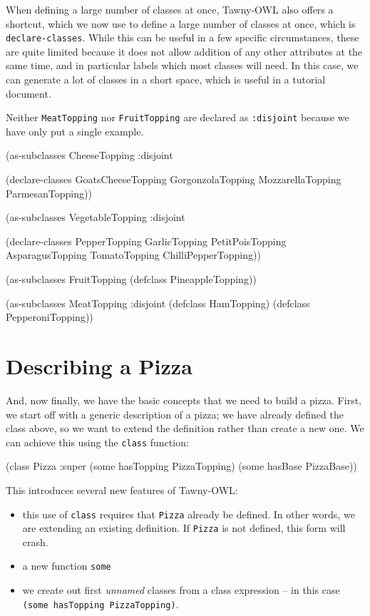 When defining a large number of classes at once, Tawny-OWL also offers a
shortcut, which we now use to define a large number of classes at once, which
is \verb~declare-classes~. While this can be useful in a few specific
circumstances, these are quite limited because it does not allow addition of
any other attributes at the same time, and in particular labels which most
classes will need. In this case, we can generate a lot of classes in a short
space, which is useful in a tutorial document.

Neither \verb~MeatTopping~ nor \verb~FruitTopping~ are declared as \verb~:disjoint~ because
we have only put a single example.

\begin{tawny}
(as-subclasses
 CheeseTopping
 :disjoint

 (declare-classes
  GoatsCheeseTopping
  GorgonzolaTopping
  MozzarellaTopping
  ParmesanTopping))

(as-subclasses
 VegetableTopping
 :disjoint

 (declare-classes
  PepperTopping
  GarlicTopping
  PetitPoisTopping
  AsparagusTopping
  TomatoTopping
  ChilliPepperTopping))

(as-subclasses
 FruitTopping
 (defclass PineappleTopping))

(as-subclasses
 MeatTopping
 :disjoint
 (defclass HamTopping)
 (defclass PepperoniTopping))
\end{tawny}

\section{Describing a Pizza}
\label{sec-5-5}

And, now finally, we have the basic concepts that we need to build a pizza.
First, we start off with a generic description of a pizza; we have already
defined the class above, so we want to extend the definition rather than
create a new one. We can achieve this using the \verb~class~ function:

\begin{tawny}
(class Pizza
   :super
   (some hasTopping PizzaTopping)
   (some hasBase PizzaBase))
\end{tawny}

This introduces several new features of Tawny-OWL:
\begin{itemize}
\item this use of \verb~class~ requires that \verb~Pizza~ already be defined. In other
words, we are extending an existing definition. If \verb~Pizza~ is not defined,
this form will crash.
\item a new function \verb~some~
\item we create out first \emph{unnamed} classes from a class expression -- in this
case \verb~(some hasTopping PizzaTopping)~.
\end{itemize}

